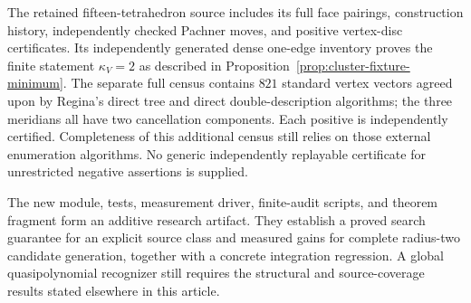 The retained fifteen-tetrahedron source includes its full face
pairings, construction history, independently checked Pachner moves,
and positive vertex-disc certificates.  Its independently generated
dense one-edge inventory proves the finite statement
$\kappa_V=2$ as described in
Proposition~\ref{prop:cluster-fixture-minimum}.  The separate full census
contains $821$ standard vertex vectors agreed upon by Regina's direct
tree and direct double-description algorithms; the three meridians all
have two cancellation components.  Each positive is independently
certified.  Completeness of this additional census still relies on
those external enumeration algorithms.  No generic independently
replayable certificate for unrestricted negative assertions is supplied.

The new module, tests, measurement driver, finite-audit scripts, and
theorem fragment form an additive research artifact.  They establish a
proved search guarantee for an explicit source class and measured gains
for complete radius-two candidate generation, together with a concrete
integration regression.  A global quasipolynomial recognizer still
requires the structural and source-coverage results stated elsewhere in
this article.
